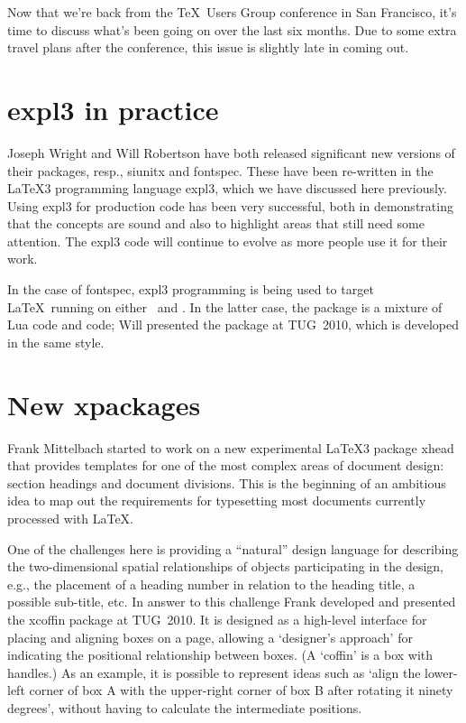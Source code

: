 \documentclass{ltnews}
\begin{document}
\maketitle

\noindent
Now that we're back from the \TeX\ Users Group conference in San
Francisco, it's time to discuss what's been going on over the last six months.
Due to some extra travel plans after the conference, this issue is slightly
late in coming out.


\section{\textsf{expl3} in practice}

Joseph Wright and Will Robertson have both released significant new versions
of their packages, resp., \textsf{siunitx} and \textsf{fontspec}. These have
been re-written in the \LaTeX3 programming language \textsf{expl3}, which we
have discussed here previously. Using \textsf{expl3} for production code has
been very successful, both in demonstrating that the concepts are sound and
also to highlight areas that still need some attention. The \textsf{expl3}
code will continue to evolve as more people use it for their work.

In the case of \textsf{fontspec}, \textsf{expl3} programming is being used to
target \LaTeX\ running on either \XeTeX\ and . In the latter
case, the package is a mixture of Lua code and  code; Will
presented the  package at TUG~2010, which is developed in
the same style.


\section{New \textsf{xpackages}}

Frank Mittelbach started to work on a new experimental \LaTeX3 package
\textsf{xhead} that provides templates for one of the most complex areas of
document design: section headings and document divisions. This
is the beginning of an ambitious idea to map out the requirements for
typesetting most documents currently processed with \LaTeX.

One of the challenges here is providing a ``natural'' design language for
describing the two-dimensional spatial relationships of objects participating
in the design, e.g., the placement of a heading number in relation to the
heading title, a possible sub-title, etc. In answer to this challenge Frank
developed and presented the \textsf{xcoffin} package at TUG~2010. It is
designed as a high-level interface for placing and aligning boxes on a page,
allowing a `designer's approach' for indicating the positional relationship
between boxes. (A `coffin' is a box with handles.) As an example, it is
possible to represent ideas such as `align the lower-left corner of box A with
the upper-right corner of box B after rotating it ninety degrees', without
having to calculate the intermediate positions.
\end{document}
